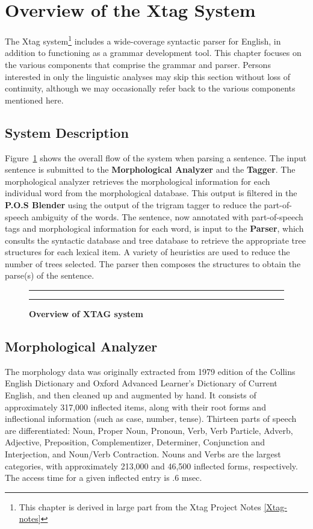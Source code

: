 \section{Overview of the Xtag System}

The Xtag system\footnote{This chapter is derived in large part from the Xtag
Project Notes \ref{Xtag-notes}} includes a wide-coverage syntactic parser for
English, in addition to functioning as a grammar development tool.  This
chapter focuses on the various components that comprise the grammar and parser.
Persons interested in only the linguistic analyses may skip this section
without loss of continuity, although we may occasionally refer back to the
various components mentioned here.

\subsection{System Description}

Figure~{\ref{flowchart}} shows the overall flow of the system when parsing a
sentence. The input sentence is submitted to the {\bf Morphological Analyzer}
and the {\bf Tagger}. The morphological analyzer retrieves the morphological
information for each individual word from the morphological database. This
output is filtered in the {\bf P.O.S Blender} using the output of the trigram
tagger to reduce the part-of-speech ambiguity of the words. The sentence, now
annotated with part-of-speech tags and morphological information for each word,
is input to the {\bf Parser}, which consults the syntactic database and tree
database to retrieve the appropriate tree structures for each lexical item.  A
variety of heuristics are used to reduce the number of trees selected. The
parser then composes the structures to obtain the parse(s) of the sentence.


\begin{figure}[ht]
\vspace{1.4in}
\centering
\rule[.1in]{3.0in}{0.01in}
{}
\caption{\bf {Overview of XTAG system }}
\label{flowchart}
\rule[.1in]{3.0in}{0.01in}
\end{figure}


\subsection{Morphological Analyzer}

The morphology data was originally extracted from 1979 edition of the Collins
English Dictionary and Oxford Advanced Learner's Dictionary of Current English,
and then cleaned up and augmented by hand.  It consists of approximately
317,000 inflected items, along with their root forms and inflectional
information (such as case, number, tense).  Thirteen parts of speech are
differentiated: Noun, Proper Noun, Pronoun, Verb, Verb Particle, Adverb,
Adjective, Preposition, Complementizer, Determiner, Conjunction and
Interjection, and Noun/Verb Contraction.  Nouns and Verbs are the largest
categories, with approximately 213,000 and 46,500 inflected forms,
respectively.  The access time for a given inflected entry is .6 msec.

